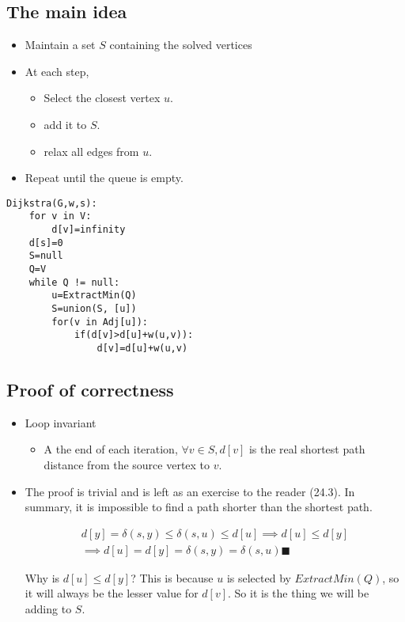 \documentclass[12pt]{book}
\begin{document}
\subsection*{The main idea}
\begin{itemize}
    \item Maintain a set $S$ containing the solved vertices
    \item At each step,
    \begin{itemize}
        \item Select the closest vertex $u$.
        \item add it to $S$.
        \item relax all edges from $u$.
    \end{itemize}
    \item Repeat until the queue is empty.
\end{itemize}

\begin{lstlisting}
Dijkstra(G,w,s):
    for v in V:
        d[v]=infinity
    d[s]=0
    S=null
    Q=V
    while Q != null:
        u=ExtractMin(Q)
        S=union(S, [u])
        for(v in Adj[u]):
            if(d[v]>d[u]+w(u,v)):
                d[v]=d[u]+w(u,v)
\end{lstlisting}

\subsection*{Proof of correctness}

\begin{itemize}
    \item Loop invariant
    \begin{itemize}
        \item A the end of each iteration, $\forall v\in S, d[v]$ is the real shortest path distance from the source vertex to $v$.
    \end{itemize}

    \item The proof is trivial and is left as an exercise to the reader (24.3). In summary, it is impossible to find a path shorter than the shortest path.
    
    \begin{align*}
        d[y]=\delta(s,y)\leq \delta(s,u)\leq d[u]\implies d[u]\leq d[y]\\
        \implies d[u]=d[y]=\delta(s,y)=\delta(s,u)\blacksquare
    \end{align*}

    Why is $d[u]\leq d[y]$? This is because $u$ is selected by $ExtractMin(Q)$, so it will always be the lesser value for $d[v]$. So it is the thing we will be adding to $S$.
\end{itemize}
\end{document}
